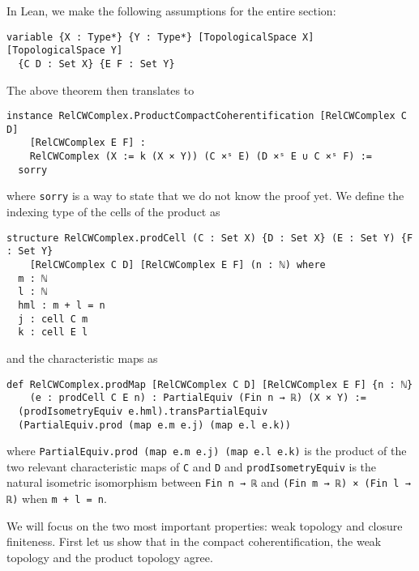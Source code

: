 In Lean, we make the following assumptions for the entire section: 

\begin{lstlisting}[frame=single]
variable {X : Type*} {Y : Type*} [TopologicalSpace X] [TopologicalSpace Y] 
  {C D : Set X} {E F : Set Y}
\end{lstlisting}

The above theorem then translates to

\begin{lstlisting}[frame=single]
instance RelCWComplex.ProductCompactCoherentification [RelCWComplex C D] 
    [RelCWComplex E F] : 
    RelCWComplex (X := k (X × Y)) (C ×ˢ E) (D ×ˢ E ∪ C ×ˢ F) := 
  sorry
\end{lstlisting}

where \lstinline|sorry| is a way to state that we do not know the proof yet. 
We define the indexing type of the cells of the product as 

\begin{lstlisting}[frame=single]
structure RelCWComplex.prodCell (C : Set X) {D : Set X} (E : Set Y) {F : Set Y} 
    [RelCWComplex C D] [RelCWComplex E F] (n : ℕ) where
  m : ℕ
  l : ℕ
  hml : m + l = n
  j : cell C m
  k : cell E l
\end{lstlisting}

and the characteristic maps as

\begin{lstlisting}[frame=single]
def RelCWComplex.prodMap [RelCWComplex C D] [RelCWComplex E F] {n : ℕ} 
    (e : prodCell C E n) : PartialEquiv (Fin n → ℝ) (X × Y) :=
  (prodIsometryEquiv e.hml).transPartialEquiv
  (PartialEquiv.prod (map e.m e.j) (map e.l e.k))
\end{lstlisting}

where \lstinline|PartialEquiv.prod (map e.m e.j) (map e.l e.k)| is the product of the two relevant characteristic maps of \lstinline|C| and \lstinline|D| and \lstinline|prodIsometryEquiv| is the natural isometric isomorphism between \lstinline|Fin n → ℝ| and \lstinline|(Fin m → ℝ) × (Fin l → ℝ)| when \lstinline|m + l = n|.

We will focus on the two most important properties: weak topology and closure finiteness. 
First let us show that in the compact coherentification, the weak topology and the product topology agree. 


